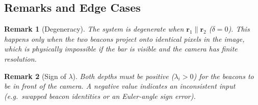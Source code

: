 \documentclass[12pt, a4paper]{article}
\newtheorem{remark}{Remark}
\begin{document}
\subsection{Remarks and Edge Cases}

\begin{remark}[Degeneracy]
The system is degenerate when $\mathbf{r}_1 \parallel \mathbf{r}_2$
($\delta = 0$). This happens only when the two beacons project onto
identical pixels in the image, which is physically impossible if the bar is
visible and the camera has finite resolution.
\end{remark}

\begin{remark}[Sign of $\lambda$]
Both depths must be positive ($\lambda_i > 0$) for the beacons to be in
front of the camera. A negative value indicates an inconsistent input
(e.g.\ swapped beacon identities or an Euler-angle sign error).
\end{remark}


\end{document}
